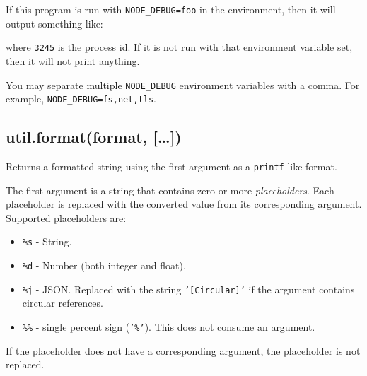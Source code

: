 If this program is run with \texttt{NODE\_DEBUG=foo} in the environment,
then it will output something like:

\begin{Shaded}
\begin{Highlighting}[]
\NormalTok{: hello from foo [}\NormalTok{]}
\end{Highlighting}
\end{Shaded}

where \texttt{3245} is the process id. If it is not run with that
environment variable set, then it will not print anything.

You may separate multiple \texttt{NODE\_DEBUG} environment variables
with a comma. For example, \texttt{NODE\_DEBUG=fs,net,tls}.

\subsection{util.format(format,
{[}\ldots{}{]})}\label{util.formatformat}

Returns a formatted string using the first argument as a
\texttt{printf}-like format.

The first argument is a string that contains zero or more
\emph{placeholders}. Each placeholder is replaced with the converted
value from its corresponding argument. Supported placeholders are:

\begin{itemize}
\itemsep1pt\parskip0pt
\item
  \texttt{\%s} - String.
\item
  \texttt{\%d} - Number (both integer and float).
\item
  \texttt{\%j} - JSON. Replaced with the string
  \texttt{'{[}Circular{]}'} if the argument contains circular
  references.
\item
  \texttt{\%\%} - single percent sign (\texttt{'\%'}). This does not
  consume an argument.
\end{itemize}

If the placeholder does not have a corresponding argument, the
placeholder is not replaced.

\begin{Shaded}
\end{Shaded}

